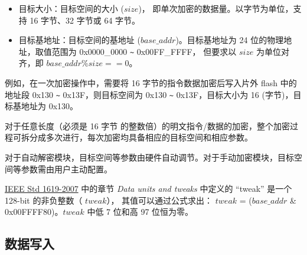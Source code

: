 \documentclass[main\_\_CN.tex]{subfiles}
\begin{document}
\begin{itemize}
    \item 目标大小：目标空间的大小 (\begin{math} size \end{math})， 即单次加密的数据量。以字节为单位，支持 16 字节、32 字节或 64 字节。
    \item 目标基地址：目标空间的基地址 (\begin{math} base\_addr\end{math})。目标基地址为 24 位的物理地址，取值范围为 0x0000\_0000 \verb+~+ 0x00FF\_FFFF， 但要求以 \begin{math} size \end{math} 为单位对齐，即 \begin{math} base\_addr \% size == 0 \end{math}。
\end{itemize}

例如，在一次加密操作中，需要将 16 字节的指令数据加密后写入片外 flash 中的地址段 0x130 \verb+~+ 0x13F，则目标空间为 0x130 \verb+~+ 0x13F，目标大小为 16 (字节)，目标基地址为 0x130。

对于任意长度（必须是 16 字节 的整数倍）的明文指令/数据的加密，整个加密过程可拆分成多次进行，每次加密均具备相应的目标空间和相应参数。

对于自动解密模块，目标空间等参数由硬件自动调节。对于手动加密模块，目标空间等参数需由用户主动配置。

\begin{tiplisting}
\vspace{-2em}
\begin{enumerate}
     \href{https://ieeexplore.ieee.org/document/4493450}{IEEE Std 1619-2007} 中的章节 \textit{Data units and tweaks} 中定义的 “tweak”  是一个 128-bit 的非负整数（ \begin{math} tweak \end{math}），
    其值可以通过公式求出： \begin{math} tweak \end{math} = (\begin{math} base\_addr \end{math} \& 0x00FFFF80)。\begin{math} tweak \end{math} 中低 7 位和高 97 位恒为零。
\end{enumerate}
\end{tiplisting}

\subsection{数据写入} 
\label{sec:extmemncr-data-writing}
\end{document}
